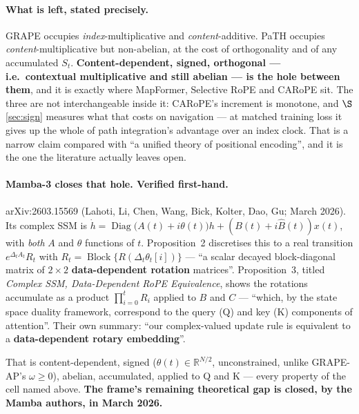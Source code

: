 \documentclass[11pt]{article}
\newcommand{\R}{\mathbb{R}}
\begin{document}
\paragraph{What is left, stated precisely.} GRAPE occupies
\emph{index}-multiplicative and \emph{content}-additive. PaTH occupies
\emph{content}-multiplicative but non-abelian, at the cost of orthogonality and of
any accumulated $S_t$. \textbf{Content-dependent, signed, orthogonal --- i.e.\
contextual multiplicative and still abelian --- is the hole between them}, and it
is exactly where MapFormer, Selective RoPE and CARoPE sit. The three are not
interchangeable inside it: CARoPE's increment is monotone, and
$\S$\ref{sec:sign} measures what that costs on navigation --- at matched training
loss it gives up the whole of path integration's advantage over an index clock. That is a narrow claim
compared with ``a unified theory of positional encoding'', and it is the one the
literature actually leaves open.

\paragraph{Mamba-3 closes that hole. Verified first-hand.} arXiv:2603.15569
(Lahoti, Li, Chen, Wang, Bick, Kolter, Dao, Gu; March 2026). Its complex SSM is
$\dot h = \operatorname{Diag}\!\big(A(t) + i\theta(t)\big)h + (B(t)+i\hat
B(t))x(t)$, with \emph{both} $A$ and $\theta$ functions of $t$. Proposition~2
discretises this to a real transition $e^{\Delta_t A_t}R_t$ with
$R_t = \operatorname{Block}\{R(\Delta_t\theta_t[i])\}$ --- ``a scalar decayed
block-diagonal matrix of $2\times2$ \textbf{data-dependent rotation} matrices''.
Proposition~3, titled \emph{Complex SSM, Data-Dependent RoPE Equivalence}, shows
the rotations accumulate as a product $\prod_{i=0}^{t}R_i$ applied to $B$ and $C$
--- ``which, by the state space duality framework, correspond to the query (Q) and
key (K) components of attention''. Their own summary: ``our complex-valued update
rule is equivalent to a \textbf{data-dependent rotary embedding}''.

That is content-dependent, signed ($\theta(t)\in\R^{N/2}$, unconstrained, unlike
GRAPE-AP's $\omega \ge 0$), abelian, accumulated, applied to Q and K --- every
property of the cell named above. \textbf{The frame's remaining theoretical gap is
closed, by the Mamba authors, in March 2026.}
\end{document}
